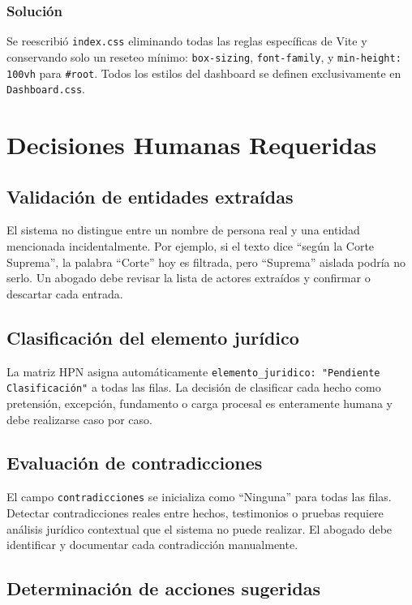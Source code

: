 \documentclass[12pt, letterpaper]{article}
\begin{document}
\subsubsection*{Solución}

Se reescribió \texttt{index.css} eliminando todas las reglas
específicas de Vite y conservando solo un reseteo mínimo:
\texttt{box-sizing}, \texttt{font-family}, y
\texttt{min-height: 100vh} para \texttt{\#root}. Todos los estilos
del dashboard se definen exclusivamente en
\texttt{Dashboard.css}.

\section{Decisiones Humanas Requeridas}

\subsection{Validación de entidades extraídas}

El sistema no distingue entre un nombre de persona real y una entidad
mencionada incidentalmente. Por ejemplo, si el texto dice ``según la
Corte Suprema'', la palabra ``Corte'' hoy es filtrada, pero ``Suprema''
aislada podría no serlo. Un abogado debe revisar la lista de actores
extraídos y confirmar o descartar cada entrada.

\subsection{Clasificación del elemento jurídico}

La matriz HPN asigna automáticamente
\texttt{elemento\_juridico: "Pendiente Clasificación"} a todas las
filas. La decisión de clasificar cada hecho como pretensión,
excepción, fundamento o carga procesal es enteramente humana y debe
realizarse caso por caso.

\subsection{Evaluación de contradicciones}

El campo \texttt{contradicciones} se inicializa como ``Ninguna'' para
todas las filas. Detectar contradicciones reales entre hechos,
testimonios o pruebas requiere análisis jurídico contextual que el
sistema no puede realizar. El abogado debe identificar y documentar
cada contradicción manualmente.

\subsection{Determinación de acciones sugeridas}
\end{document}
